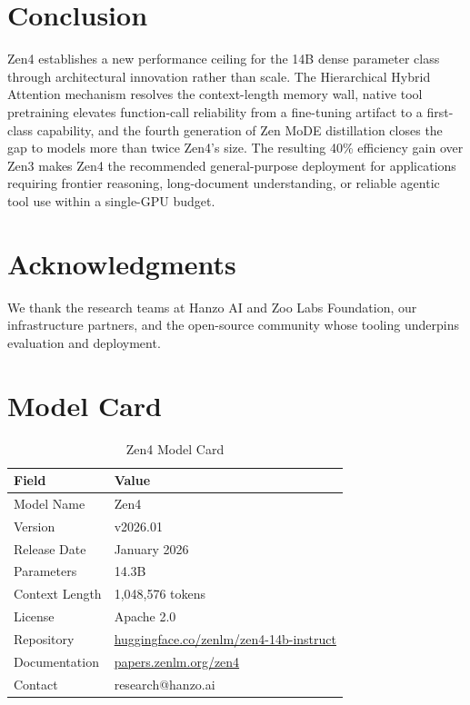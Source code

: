 \documentclass[11pt,a4paper]{article}
\begin{document}
\section{Conclusion}

Zen4 establishes a new performance ceiling for the 14B dense parameter class through
architectural innovation rather than scale. The Hierarchical Hybrid Attention mechanism
resolves the context-length memory wall, native tool pretraining elevates function-call
reliability from a fine-tuning artifact to a first-class capability, and the fourth
generation of Zen MoDE distillation closes the gap to models more than twice Zen4's size.
The resulting 40\% efficiency gain over Zen3 makes Zen4 the recommended general-purpose
deployment for applications requiring frontier reasoning, long-document understanding,
or reliable agentic tool use within a single-GPU budget.

\section*{Acknowledgments}

We thank the research teams at Hanzo AI and Zoo Labs Foundation, our infrastructure
partners, and the open-source community whose tooling underpins evaluation and deployment.




\appendix

\section{Model Card}

\begin{table}[H]
\centering
\begin{tabular}{ll}
\toprule
\textbf{Field} & \textbf{Value} \\
\midrule
Model Name      & Zen4 \\
Version         & v2026.01 \\
Release Date    & January 2026 \\
Parameters      & 14.3B \\
Context Length  & 1,048,576 tokens \\
License         & Apache 2.0 \\
Repository      & \href{https://huggingface.co/zenlm/zen4-14b-instruct}{huggingface.co/zenlm/zen4-14b-instruct} \\
Documentation   & \href{https://papers.zenlm.org/zen4}{papers.zenlm.org/zen4} \\
Contact         & research@hanzo.ai \\
\bottomrule
\end{tabular}
\caption{Zen4 Model Card}
\end{table}
\end{document}
